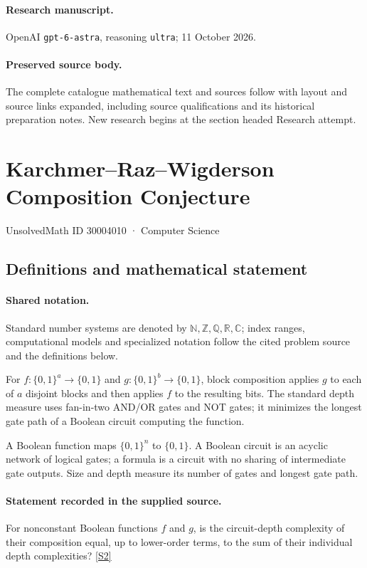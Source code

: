 \documentclass[11pt]{article}
\begin{document}
\paragraph{Research manuscript.} OpenAI \texttt{gpt-6-astra}, reasoning \texttt{ultra}; 11 October 2026.
\paragraph{Preserved source body.} The complete catalogue mathematical text and sources follow with layout and source links expanded, including source qualifications and its historical preparation notes. New research begins at the section headed Research attempt.

\section{Karchmer–Raz–Wigderson Composition Conjecture}\label{30004010}
{\small UnsolvedMath ID 30004010 · Computer Science}
\subsection{Definitions and mathematical statement}

\paragraph{Shared notation.}Standard number systems are denoted by $\mathbb N,\mathbb Z,\mathbb Q,\mathbb R,\mathbb C$; index ranges, computational models and specialized notation follow the cited problem source and the definitions below.


For $f:\{0,1\}^a\to\{0,1\}$ and $g:\{0,1\}^b\to\{0,1\}$, block composition applies $g$ to each of $a$ disjoint blocks and then applies $f$ to the resulting bits. The standard depth measure uses fan-in-two AND/OR gates and NOT gates; it minimizes the longest gate path of a Boolean circuit computing the function.

A Boolean function maps $\{0,1\}^n$ to $\{0,1\}$. A Boolean circuit is an acyclic network of logical gates; a formula is a circuit with no sharing of intermediate gate outputs. Size and depth measure its number of gates and longest gate path.
\paragraph{Statement recorded in the supplied source.}
For nonconstant Boolean functions $f$ and $g$, is the circuit-depth complexity of their composition equal, up to lower-order terms, to the sum of their individual depth complexities? \href{https://doi.org/10.4171/owr/2018/51}{[S2]}
\end{document}
